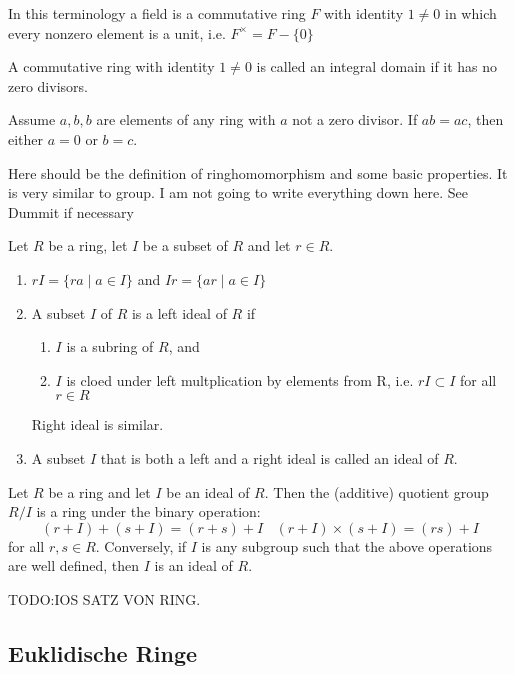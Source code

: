 \begin{remark}
    In this terminology a field is a commutative ring \(F\) with identity \(1 \not = 0\) in which every nonzero element is a unit, i.e. \(F^\times = F - \{0\}\)
\end{remark}

\begin{definition}
    A commutative ring with identity \(1 \not = 0\) is called an integral domain if it has no zero divisors.
\end{definition}
\begin{remark}
    Assume \(a,b,b\) are elements of any ring with \(a\) not a zero divisor. If \(ab=ac\), then either \(a = 0\) or \(b = c\).
\end{remark}

\begin{remark}
    Here should be the definition of ringhomomorphism and some basic properties. It is very similar to group. I am not going to write everything down here. See Dummit if necessary
\end{remark}

\begin{definition}[Ideal]
    Let \(R\) be a ring, let \(I\) be a subset of \(R\) and let \(r \in R\).
    \begin{enumerate}
        \item \(rI = \{ra\mid a \in I\}\) and \(Ir = \{ar \mid a\in I\}\)
        \item A subset \(I\) of \(R\) is a left ideal of \(R\) if\begin{enumerate}
            \item \(I\) is a subring of \(R\), and
            \item \(I\) is cloed under left multplication by elements from R, i.e. \(rI\subset I\) for all \(r\in R\)   
        \end{enumerate}
        Right ideal is similar.
        \item A subset \(I\) that is both a left and a right ideal is called an ideal of \(R\).
    \end{enumerate}
\end{definition}
\begin{remark}
    Let \(R\) be a ring and let \(I\) be an ideal of \(R\). Then the (additive) quotient group \(R/I\) is a ring under the binary operation:\[(r+I) + (s+I) = (r+s)+I \ \ \ \ (r+I) \times (s+I) = (rs)+I\] for all \(r,s\in R\). Conversely, if \(I\) is any subgroup such that the above operations are well defined, then \(I\) is an ideal of \(R\).
\end{remark}

TODO:IOS SATZ VON RING.\\
\subsection{Euklidische Ringe}